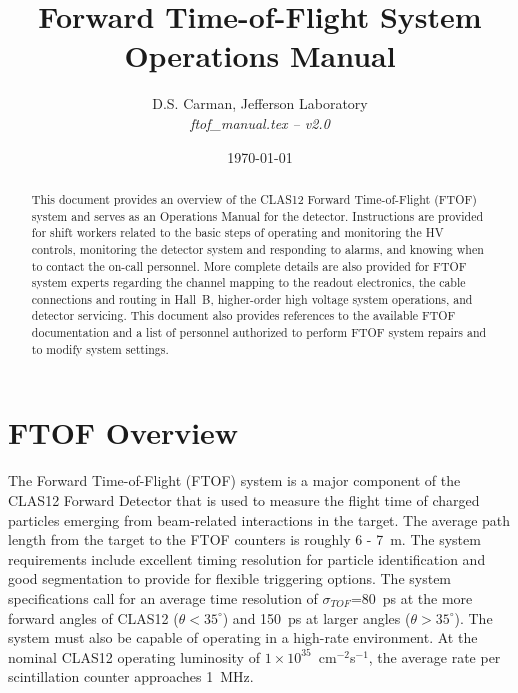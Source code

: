 \documentclass[12pt]{article}
\begin{document}
\title{Forward Time-of-Flight System Operations Manual}

\vskip 0.5cm

\author{D.S. Carman, Jefferson Laboratory\\[0.2ex]
{\it ftof\_manual.tex -- v2.0}}

\date \today
%
\maketitle

\begin{abstract}
This document provides an overview of the CLAS12 Forward Time-of-Flight (FTOF) system 
and serves as an Operations Manual for the detector. Instructions are provided for 
shift workers related to the basic steps of operating and monitoring the HV controls, 
monitoring the detector system and responding to alarms, and knowing when to contact 
the on-call personnel. More complete details are also provided for FTOF system experts 
regarding the channel mapping to the readout electronics, the cable connections and 
routing in Hall~B, higher-order high voltage system operations, and detector servicing. 
This document also provides references to the available FTOF documentation and a list 
of personnel authorized to perform FTOF system repairs and to modify system settings.
\end{abstract}

\thispagestyle{empty}

\clearpage

\vfil
\eject

\tableofcontents

\vfil
\eject

\section{FTOF Overview}
\label{intro}

The Forward Time-of-Flight (FTOF) system is a major component of the CLAS12 Forward 
Detector that is used to measure the flight time of charged particles emerging from 
beam-related interactions in the target. The average path length from the target to 
the FTOF counters is roughly 6 - 7~m. The system requirements include excellent timing 
resolution for particle identification and good segmentation to provide for flexible 
triggering options. The system specifications call for an average time resolution of 
$\sigma_{TOF}$=80~ps at the more forward angles of CLAS12 ($\theta < 35^\circ$) and 
150~ps at larger angles ($\theta > 35^\circ$). The system must also be capable of 
operating in a high-rate environment. At the nominal CLAS12 operating luminosity of 
$1 \times 10^{35}$~cm$^{-2}$s$^{-1}$, the average rate per scintillation counter approaches
1~MHz.
\end{document}
